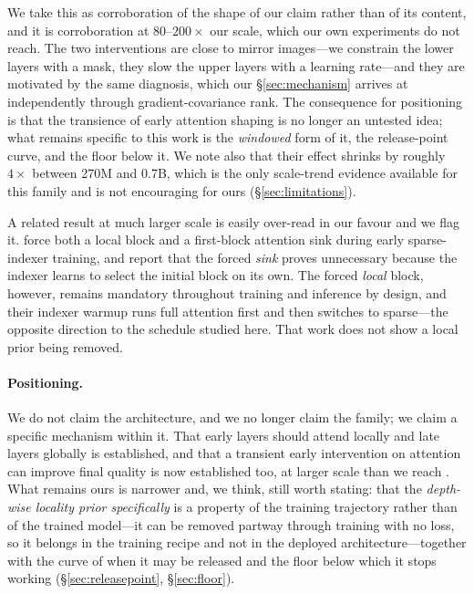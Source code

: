 \documentclass[11pt,a4paper]{article}
\begin{document}
We take this as corroboration of the shape of our claim rather than of its content, and it is corroboration at $80$--$200\times$ our scale, which our own experiments do not reach. The two interventions are close to mirror images---we constrain the lower layers with a mask, they slow the upper layers with a learning rate---and they are motivated by the same diagnosis, which our \S\ref{sec:mechanism} arrives at independently through gradient-covariance rank. The consequence for positioning is that the transience of early attention shaping is no longer an untested idea; what remains specific to this work is the \emph{windowed} form of it, the release-point curve, and the floor below it. We note also that their effect shrinks by roughly $4\times$ between 270M and 0.7B, which is the only scale-trend evidence available for this family and is not encouraging for ours (\S\ref{sec:limitations}).

A related result at much larger scale is easily over-read in our favour and we flag it. \citet{lai2026minimax} force both a local block and a first-block attention sink during early sparse-indexer training, and report that the forced \emph{sink} proves unnecessary because the indexer learns to select the initial block on its own. The forced \emph{local} block, however, remains mandatory throughout training and inference by design, and their indexer warmup runs full attention first and then switches to sparse---the opposite direction to the schedule studied here. That work does not show a local prior being removed.

\paragraph{Positioning.} We do not claim the architecture, and we no longer claim the family; we claim a specific mechanism within it. That early layers should attend locally and late layers globally is established, and that a transient early intervention on attention can improve final quality is now established too, at larger scale than we reach \citep{zhu2026learningless}. What remains ours is narrower and, we think, still worth stating: that the \emph{depth-wise locality prior specifically} is a property of the training trajectory rather than of the trained model---it can be removed partway through training with no loss, so it belongs in the training recipe and not in the deployed architecture---together with the curve of when it may be released and the floor below which it stops working (\S\ref{sec:releasepoint}, \S\ref{sec:floor}).
\end{document}
